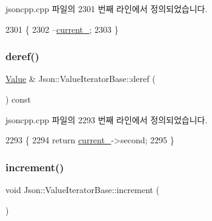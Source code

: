 jsoncpp.\+cpp 파일의 2301 번째 라인에서 정의되었습니다.


\begin{DoxyCode}
2301                                   \{
2302   --\hyperlink{class_json_1_1_value_iterator_base_ab3138ce8af8301cca3b041ea55cb922a}{current\_};
2303 \}
\end{DoxyCode}
\mbox{\label{class_json_1_1_value_iterator_base_aa5b75c9514a30ba2ea3c9a35c165c18e}} 
\subsubsection{\texorpdfstring{deref()}{deref()}}
{\footnotesize\ttfamily \hyperlink{class_json_1_1_value}{Value} \& Json\+::\+Value\+Iterator\+Base\+::deref (\begin{DoxyParamCaption}{ }\end{DoxyParamCaption}) const\hspace{0.3cm}{\ttfamily [protected]}}



jsoncpp.\+cpp 파일의 2293 번째 라인에서 정의되었습니다.


\begin{DoxyCode}
2293                                       \{
2294   \textcolor{keywordflow}{return} \hyperlink{class_json_1_1_value_iterator_base_ab3138ce8af8301cca3b041ea55cb922a}{current\_}->second;
2295 \}
\end{DoxyCode}
\mbox{\label{class_json_1_1_value_iterator_base_afe58f9534e1fd2033419fd9fe244551e}} 
\subsubsection{\texorpdfstring{increment()}{increment()}}
{\footnotesize\ttfamily void Json\+::\+Value\+Iterator\+Base\+::increment (\begin{DoxyParamCaption}{ }\end{DoxyParamCaption})\hspace{0.3cm}{\ttfamily [protected]}}



